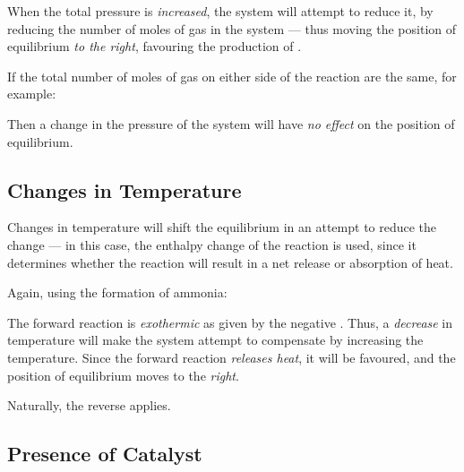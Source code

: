 			When the total pressure is \textit{increased}, the system will attempt to reduce it, by reducing the number of moles of gas
			in the system --- thus moving the position of equilibrium \textit{to the right}, favouring the production of .

			If the total number of moles of gas on either side of the reaction are the same, for example:


			Then a change in the pressure of the system will have \textit{no effect} on the position of equilibrium.



		\subsection{Changes in Temperature}

			Changes in temperature will shift the equilibrium in an attempt to reduce the change --- in this case, the enthalpy change
			of the reaction is used, since it determines whether the reaction will result in a net release or absorption of heat.

			Again, using the formation of ammonia:


			The forward reaction is \textit{exothermic} as given by the negative \enth{}. Thus, a \textit{decrease} in temperature will
			make the system attempt to compensate by increasing the temperature. Since the forward reaction \textit{releases heat}, it will
			be favoured, and the position of equilibrium moves to the \textit{right}.

			Naturally, the reverse applies.



		\subsection{Presence of Catalyst}

